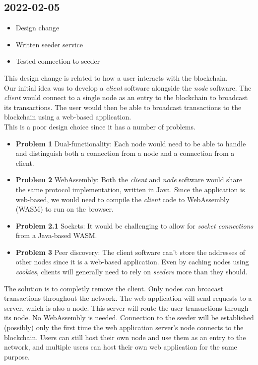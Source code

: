 \documentclass{article}
\begin{document}
\subsection*{2022-02-05}

\begin{itemize}
    \item Design change
    \item Written seeder service
    \item Tested connection to seeder
\end{itemize}

This design change is related to how a user interacts with the blockchain. \\
Our initial idea was to develop a \textit{client} software alongside the \textit{node} software.
The \textit{client} would connect to a single node as an entry to the blockchain to broadcast its transactions.
The user would then be able to broadcast transactions to the blockchain using a web-based application. \\
This is a poor design choice since it has a number of problems.

\begin{itemize}
    \item \textbf{Problem 1} Dual-functionality: Each node would need to be able to handle and distinguish both a connection
    from a node and a connection from a client.
    \item \textbf{Problem 2} WebAssembly: Both the \textit{client} and \textit{node} software would share the same
    protocol implementation, written in Java. Since the application is web-based, we would need to
    compile the \textit{client} code to WebAssembly (WASM) to run on the browser.
    \item \textbf{Problem 2.1} Sockets: It would be challenging to allow for \textit{socket connections}
    from a Java-based WASM.
    \item \textbf{Problem 3} Peer discovery: The client software can't store the addresses of other nodes
    since it is a web-based application. Even by caching nodes using \textit{cookies}, clients will generally
    need to rely on \textit{seeders} more than they should.
\end{itemize}

The solution is to completly remove the client. Only nodes can broacast transactions throughout the network.
The web application will send requests to a server, which is also a node.
This server will route the user transactions through its node.
No WebAssembly is needed. Connection to the seeder will be established (possibly) only the first time the web
application server's node connects to the blockchain. Users can still host their own node and use them as an entry to the network, and
multiple users can host their own web application for the same purpose.
\end{document}
